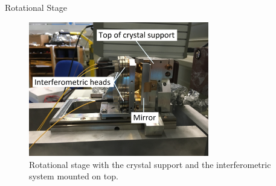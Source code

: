 \documentclass[10pt]{beamer}
\begin{document}
\begin{frame}{Rotational Stage}
  \begin{figure}[h]
    \centering
    \includegraphics[width=0.7\textwidth]{../fig/rotational-stage-interferometer.jpg}
    \caption{\label{fig:rotationalstage-side} Rotational stage with the crystal support and the interferometric system mounted on top.}
  \end{figure}
\end{frame}
\end{document}
